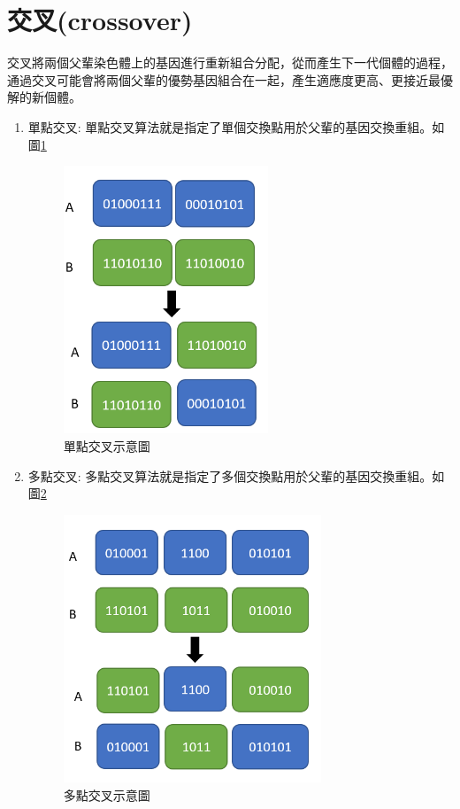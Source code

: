 \section{交叉(crossover)}
交叉將兩個父輩染色體上的基因進行重新組合分配，從而產生下一代個體的過程，通過交叉可能會將兩個父輩的優勢基因組合在一起，產生適應度更高、更接近最優解的新個體。

\begin{enumerate}
	\item
	      單點交叉:
	      單點交叉算法就是指定了單個交換點用於父輩的基因交換重組。如圖\ref{fig:SinglePointCross}
	      \begin{figure}[H]
		      \centerline{\includegraphics[height=8cm]{pic/one.PNG}}
		      \caption{單點交叉示意圖}
		      \label{fig:SinglePointCross}
	      \end{figure}

	\item
	      多點交叉:
	      多點交叉算法就是指定了多個交換點用於父輩的基因交換重組。如圖\ref{fig:MultiPointCross}
	      \begin{figure}[H]
		      \centerline{\includegraphics[height=8cm]{pic/TWO.PNG}}
		      \caption{多點交叉示意圖}
		      \label{fig:MultiPointCross}
	      \end{figure}


\end{enumerate}
